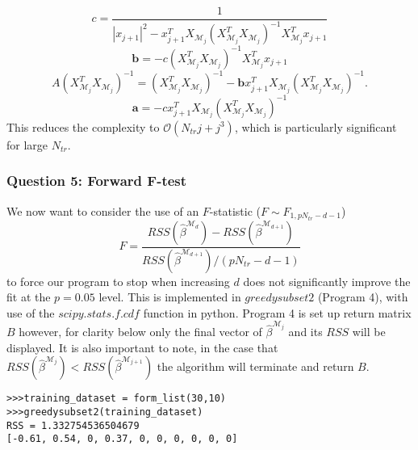 \documentclass{article}
\begin{document}
\begin{equation*}
c= \frac{1}{|x_{j+1}|^2 -x_{j+1}^T X_{\mathcal{M}_{j}} (X_{\mathcal{M}_{j}}^T X_{\mathcal{M}_{j}} )^{-1} X_{\mathcal{M}_{j}}^T x_{j+1}}
\end{equation*}
\begin{equation*}
\mathbf{b} = -c (X_{\mathcal{M}_{j}}^T X_{\mathcal{M}_{j}})^{-1} X_{\mathcal{M}_{j}}^T x_{j+1}
\end{equation*}
\begin{equation*}
A(X_{\mathcal{M}_{j}}^T X_{\mathcal{M}_{j}} )^{-1} = (X_{\mathcal{M}_{j}}^T X_{\mathcal{M}_{j}})^{-1} - \mathbf{b}x_{j+1}^T X_{\mathcal{M}_{j}} (X_{\mathcal{M}_{j}}^T X_{\mathcal{M}_{j}})^{-1}.
\end{equation*}
\begin{equation*}
\mathbf{a} = -c x_{j+1}^T X_{\mathcal{M}_j} (X_{\mathcal{M}_{j}}^T X_{\mathcal{M}_{j}})^{-1}
\end{equation*}
This reduces the complexity to $\mathcal{O}(N_{tr} j + j^3)$, which is particularly significant for large $N_{tr}$.

\subsubsection{Question 5: Forward F-test}

We now want to consider the use of an $F$-statistic ($F \sim F_{1,p N_{tr}-d-1}$)
\begin{equation*}
F=\frac{RSS(\hat{\beta}^{\mathcal{M}_d})-RSS(\hat{\beta}^{\mathcal{M}_{d+1}})}{RSS(\hat{\beta}^{\mathcal{M}_{d+1}}) / (p N_{tr}-d-1)}
\end{equation*}
to force our program to stop when increasing $d$ does not significantly improve the fit at the $p=0.05$ level. This is implemented in $\textit{greedysubset2}$ (Program 4), with use of the $\textit{scipy.stats.f.cdf}$ function in python. Program 4 is set up return matrix $B$ however, for clarity below only the final vector of $\hat{\beta}^{\mathcal{M}_j}$ and its $RSS$ will be displayed. It is also important to note, in the case that $RSS(\hat{\beta}^{\mathcal{M}_j}) < RSS (\hat{\beta}^{\mathcal{M}_{j+1}})$ the algorithm will terminate and return $B$.

\begin{lstlisting}
>>>training_dataset = form_list(30,10) 
>>>greedysubset2(training_dataset)
RSS = 1.332754536504679
[-0.61, 0.54, 0, 0.37, 0, 0, 0, 0, 0, 0]
\end{lstlisting}
\end{document}
